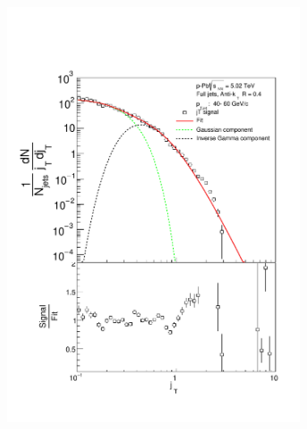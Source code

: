 \begin{figure}
\centering
\begin{subfigure}{0.24\textwidth}
\includegraphics[width=0.95\textwidth]{results/JetConejTSignalFit/JetConejTSignalFitNFin00JetPt04randomBgBayes}

\end{subfigure}
\end{figure}
